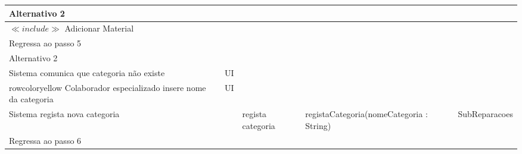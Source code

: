 \documentclass[../relatorio.tex]{subfiles}
\begin{document}
\begin{landscape}
\begin{table}[!h]
\begin{tabular}{|p{5cm}|p{1cm}|p{4cm}|p{6cm}|p{3cm}|}
            \\
            \hline
            \rowcolor{red!30}
            Alternativo 2 &                                                  &                  &     &            \\
            \hline
            $\ll include \gg$ Adicionar Material
                     & 
                     & 
                     & 
                     & 
            \\
            \hline
            Regressa ao passo 5
                     & 
                     & 
                     & 
                     & 
            \\
            \hline
            \rowcolor{red!30}
            Alternativo 2 &                                                  &                  &     &            \\
            \hline
            \rowcolor{yellow}
            Sistema comunica que categoria não existe 
                     & UI
                     & 
                     & 
                     & 
            \\
            \hline
            rowcolor{yellow}
            Colaborador especializado insere nome da categoria 
                     & UI
                     & 
                     & 
                     & 
            \\
            \hline
            Sistema regista nova categoria
                     & 
                     & regista categoria 
                     & registaCategoria(nomeCategoria : String)
                     & SubReparacoes
            \\
            \hline
            Regressa ao passo 6
                     & 
                     & 
                     & 
                     & 
            \\
            \hline
        \end{tabular}
    \end{table}
\end{landscape}
\end{document}
